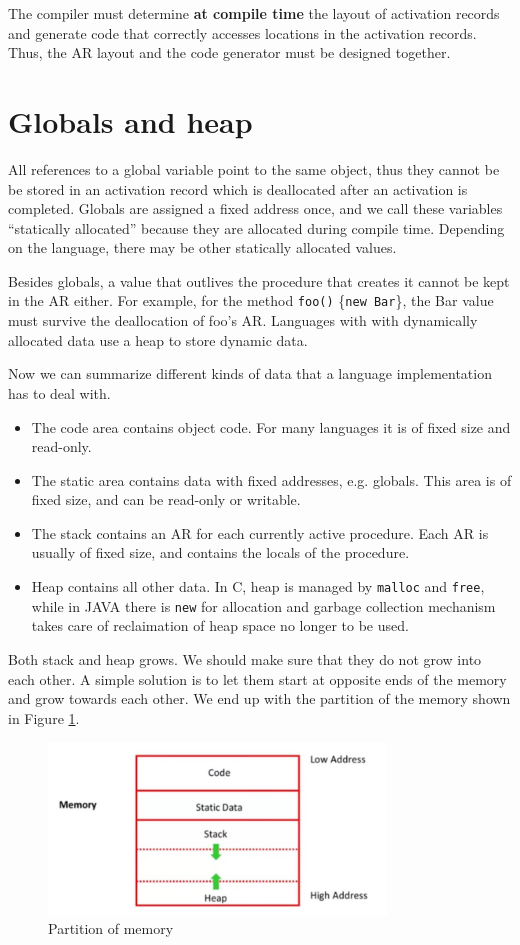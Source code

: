 The compiler must determine \textbf{at compile time} the layout of activation records and generate code that correctly accesses locations in the activation records. Thus, the AR layout and the code generator must be designed together.
\section{Globals and heap}
All references to a global variable point to the same object, thus they cannot be be stored in an activation record which is deallocated after an activation is completed. Globals are assigned a fixed address once, and we call these variables ``statically allocated'' because they are allocated during compile time. Depending on the language, there may be other statically allocated values.

Besides globals, a value that outlives the procedure that creates it cannot be kept in the AR either. For example, for the method \texttt{foo()} \{\texttt{new Bar}\}, the Bar value must survive the deallocation of foo's AR. Languages with with dynamically allocated data use a heap to store dynamic data. 

Now we can summarize different kinds of data that a language implementation has to deal with. 
\begin{itemize}
\item The code area contains object code. For many languages it is of fixed size and read-only.
\item The static area contains data with fixed addresses, e.g. globals. This area is of fixed size, and can be read-only or writable.
\item The stack contains an AR for each currently active procedure. Each AR is usually of fixed size, and contains the locals of the procedure.
\item Heap contains all other data. In C, heap is managed by \texttt{malloc} and \texttt{free}, while in JAVA there is \texttt{new} for allocation and garbage collection mechanism takes care of reclaimation of heap space no longer to be used.
\end{itemize}
Both stack and heap grows. We should make sure that they do not grow into each other. A simple solution is to let them start at opposite ends of the memory and grow towards each other. We end up with the partition of the memory shown in Figure \ref{mempart}. 
\begin{figure}[ht]
\centering
\includegraphics[width = 0.8\textwidth]{memory.jpg}
\caption{Partition of memory}\label{mempart}
\end{figure}

